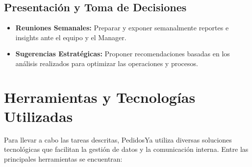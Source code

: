 \subsection{Presentación y Toma de Decisiones}
\begin{itemize}
	\item \textbf{Reuniones Semanales:} Preparar y exponer semanalmente reportes e insights ante el equipo y el Manager.
	\item \textbf{Sugerencias Estratégicas:} Proponer recomendaciones basadas en los análisis realizados para optimizar las operaciones y procesos.
\end{itemize}

\section{Herramientas y Tecnologías Utilizadas \label{sec:sec3}}
Para llevar a cabo las tareas descritas, PedidosYa utiliza diversas soluciones tecnológicas que facilitan la gestión de datos y la comunicación interna. Entre las principales herramientas se encuentran:

